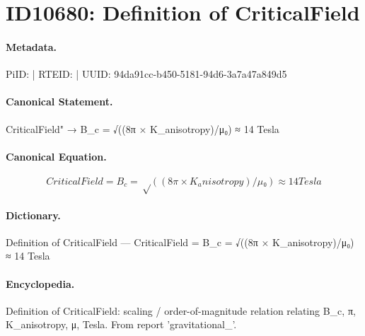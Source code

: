 \section*{ID10680: Definition of CriticalField}
\paragraph{Metadata.}
PiID:  | RTEID:  | UUID: 94da91cc-b450-5181-94d6-3a7a47a849d5

\paragraph{Canonical Statement.}
CriticalField" → B\_c = √((8π × K\_anisotropy)/μ₀) ≈ 14 Tesla

\paragraph{Canonical Equation.}
\[
CriticalField = B_c = √((8π × K_anisotropy)/μ₀) ≈ 14 Tesla
\]

\paragraph{Dictionary.}
Definition of CriticalField — CriticalField = B\_c = √((8π × K\_anisotropy)/μ₀) ≈ 14 Tesla

\paragraph{Encyclopedia.}
Definition of CriticalField: scaling / order-of-magnitude relation relating B\_c, π, K\_anisotropy, μ, Tesla. From report 'gravitational\_'.
